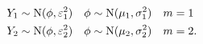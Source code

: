 \begin{align*}
  Y_{1} \sim \text{N}(\phi, \varepsilon_{1}^{2}) &\quad
  \phi \sim \text{N}(\mu_{1}, \sigma_{1}^2) \quad m = 1\\
  Y_{2} \sim \text{N}(\phi, \varepsilon_{2}^{2}) &\quad
  \phi \sim \text{N}(\mu_{2}, \sigma_{2}^2)\quad m = 2.
\end{align*}